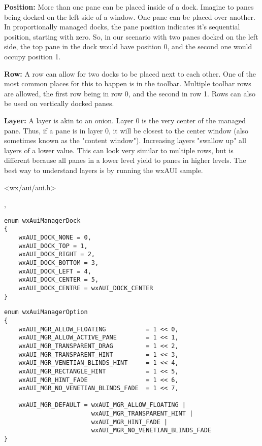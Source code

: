 {\bf Position:}
More than one pane can be placed inside of a dock. Imagine to panes
being docked on the left side of a window. One pane can be placed over
another. In proportionally managed docks, the pane position indicates
it's sequential position, starting with zero. So, in our scenario with
two panes docked on the left side, the top pane in the dock would have
position 0, and the second one would occupy position 1.

{\bf Row:}
A row can allow for two docks to be placed next to each other. One of
the most common places for this to happen is in the toolbar. Multiple
toolbar rows are allowed, the first row being in row 0, and the second
in row 1. Rows can also be used on vertically docked panes.


{\bf Layer:}
A layer is akin to an onion. Layer 0 is the very center of the
managed pane. Thus, if a pane is in layer 0, it will be closest to the
center window (also sometimes known as the "content window").
Increasing layers "swallow up" all layers of a lower value. This can
look very similar to multiple rows, but is different because all panes
in a lower level yield to panes in higher levels. The best way to
understand layers is by running the wxAUI sample.




<wx/aui/aui.h>


,


\begin{verbatim}
enum wxAuiManagerDock
{
    wxAUI_DOCK_NONE = 0,
    wxAUI_DOCK_TOP = 1,
    wxAUI_DOCK_RIGHT = 2,
    wxAUI_DOCK_BOTTOM = 3,
    wxAUI_DOCK_LEFT = 4,
    wxAUI_DOCK_CENTER = 5,
    wxAUI_DOCK_CENTRE = wxAUI_DOCK_CENTER
}
\end{verbatim}

\begin{verbatim}
enum wxAuiManagerOption
{
    wxAUI_MGR_ALLOW_FLOATING           = 1 << 0,
    wxAUI_MGR_ALLOW_ACTIVE_PANE        = 1 << 1,
    wxAUI_MGR_TRANSPARENT_DRAG         = 1 << 2,
    wxAUI_MGR_TRANSPARENT_HINT         = 1 << 3,
    wxAUI_MGR_VENETIAN_BLINDS_HINT     = 1 << 4,
    wxAUI_MGR_RECTANGLE_HINT           = 1 << 5,
    wxAUI_MGR_HINT_FADE                = 1 << 6,
    wxAUI_MGR_NO_VENETIAN_BLINDS_FADE  = 1 << 7,

    wxAUI_MGR_DEFAULT = wxAUI_MGR_ALLOW_FLOATING |
                        wxAUI_MGR_TRANSPARENT_HINT |
                        wxAUI_MGR_HINT_FADE |
                        wxAUI_MGR_NO_VENETIAN_BLINDS_FADE
}
\end{verbatim}


